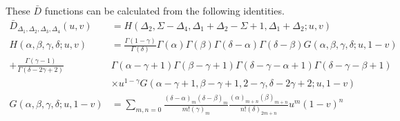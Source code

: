 \documentclass[12pt,a4paper,oneside]{book}
\theoremstyle{definition}
\begin{document}
        These $\bar{D}$ functions can be calculated from the following identities.
        \begin{align}\label{Dfunctionidentities}
            \bar{D}_{\Delta_1,\Delta_2,\Delta_3,\Delta_4}(u,v) &= H(\Delta_2,\Sigma-\Delta_4,\Delta_1+\Delta_2-\Sigma+1,\Delta_1+\Delta_2;u,v)\nonumber\\
            H(\alpha,\beta,\gamma,\delta;u,v) &= \frac{\Gamma(1-\gamma)}{\Gamma(\delta)}\Gamma(\alpha)\Gamma(\beta)\Gamma(\delta-\alpha)\Gamma(\delta-\beta)G(\alpha,\beta,\gamma,\delta;u,1-v) \nonumber\\ + \frac{\Gamma(\gamma-1)}{\Gamma(\delta-2\gamma+2)}&\Gamma(\alpha-\gamma+1)\Gamma(\beta-\gamma+1)\Gamma(\delta-\gamma-\alpha+1)\Gamma(\delta-\gamma-\beta+1)\nonumber\\ &\times u^{1-\gamma}G(\alpha-\gamma+1,\beta-\gamma+1,2-\gamma,\delta-2\gamma+2;u,1-v)\nonumber\\
            G(\alpha,\beta,\gamma,\delta;u,1-v) &= \sum_{m,n=0}\frac{(\delta-\alpha)_m (\delta-\beta)_m}{m!(\gamma)_m}\frac{(\alpha)_{m+n}(\beta)_{m+n}}{n!(\delta)_{2m+n}}u^{m}(1-v)^{n}
        \end{align}
\end{document}
